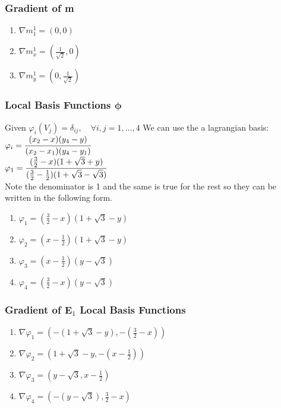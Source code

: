 \documentclass{article}
\begin{document}
\subsubsection{Gradient of m}
\begin{enumerate}
    \item $\nabla m_1^1 = (0,0)$
    \item $\nabla m_x^1 = (\frac{1}{\sqrt{2}},0)$ 
    \item $\nabla m_y^1 = (0,\frac{1}{\sqrt{2}})$ 
\end{enumerate}


\subsubsection{Local Basis Functions $\mathbf{\phi}$}
Given $\varphi_i(V_j) = \delta_{ij}, \quad \forall i,j = 1, \ldots ,4$
We can use the a lagrangian basis:
$\varphi_i = \cfrac{(x_2-x)(y_4-y)}{(x_2-x_1)(y_4-y_1)}$\\

$\varphi_1 = \cfrac{(\frac{3}{2} - x)(1+\sqrt{3} + y)}{(\frac{3}{2}-\frac{1}{2})(1+\sqrt{3} - \sqrt{3})}$\\
Note the denominator is 1 and the same is true for the rest so they can be written in the following form.\\
\begin{enumerate}
    \item $\varphi_1 = (\frac{3}{2} - x)(1 + \sqrt{3} - y)$
    \item $\varphi_2 = (x - \frac{1}{2})(1 + \sqrt{3} - y)$
    \item $\varphi_3 = (x - \frac{1}{2} )(y - \sqrt{3})$
    \item $\varphi_4 = (\frac{3}{2} - x)(y - \sqrt{3})$
\end{enumerate}


\subsubsection{Gradient of E$_1$ Local Basis Functions}
\begin{enumerate}
    \item $\nabla\varphi_1 = \left(-(1 + \sqrt{3} - y),  -(\frac{3}{2}-x)\right)$
    \item $\nabla\varphi_2 = \left(1 + \sqrt{3} - y,-(x - \frac{1}{2})\right)$
    \item $\nabla\varphi_3 = \left(y - \sqrt{3},x - \frac{1}{2}\right)$
    \item $\nabla\varphi_4 = \left(-(y-\sqrt{3}),\frac{3}{2}-x\right)$
\end{enumerate}
\end{document}
